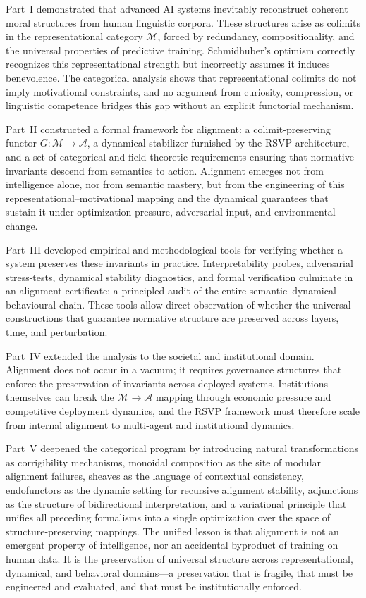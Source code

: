 \documentclass[12pt]{article}
\theoremstyle{definition}
\begin{document}
Part~I demonstrated that advanced AI systems inevitably reconstruct coherent
moral structures from human linguistic corpora. These structures arise as
colimits in the representational category $\mathcal{M}$, forced by redundancy,
compositionality, and the universal properties of predictive training.
Schmidhuber's optimism correctly recognizes this representational strength but
incorrectly assumes it induces benevolence. The categorical analysis shows that
representational colimits do not imply motivational constraints, and no argument
from curiosity, compression, or linguistic competence bridges this gap without
an explicit functorial mechanism.

Part~II constructed a formal framework for alignment: a colimit-preserving
functor $G : \mathcal{M} \to \mathcal{A}$, a dynamical stabilizer furnished by
the RSVP architecture, and a set of categorical and field-theoretic requirements
ensuring that normative invariants descend from semantics to action. Alignment
emerges not from intelligence alone, nor from semantic mastery, but from the
engineering of this representational--motivational mapping and the dynamical
guarantees that sustain it under optimization pressure, adversarial input, and
environmental change.

Part~III developed empirical and methodological tools for verifying whether a
system preserves these invariants in practice. Interpretability probes,
adversarial stress-tests, dynamical stability diagnostics, and formal
verification culminate in an alignment certificate: a principled audit of the
entire semantic--dynamical--behavioural chain. These tools allow direct
observation of whether the universal constructions that guarantee normative
structure are preserved across layers, time, and perturbation.

Part~IV extended the analysis to the societal and institutional domain.
Alignment does not occur in a vacuum; it requires governance structures that
enforce the preservation of invariants across deployed systems. Institutions
themselves can break the $\mathcal{M} \to \mathcal{A}$ mapping through economic
pressure and competitive deployment dynamics, and the RSVP framework must
therefore scale from internal alignment to multi-agent and institutional
dynamics.

Part~V deepened the categorical program by introducing natural transformations
as corrigibility mechanisms, monoidal composition as the site of modular
alignment failures, sheaves as the language of contextual consistency,
endofunctors as the dynamic setting for recursive alignment stability,
adjunctions as the structure of bidirectional interpretation, and a variational
principle that unifies all preceding formalisms into a single optimization over
the space of structure-preserving mappings. The unified lesson is that alignment
is not an emergent property of intelligence, nor an accidental byproduct of
training on human data. It is the preservation of universal structure across
representational, dynamical, and behavioral domains---a preservation that is
fragile, that must be engineered and evaluated, and that must be institutionally
enforced.
\end{document}
